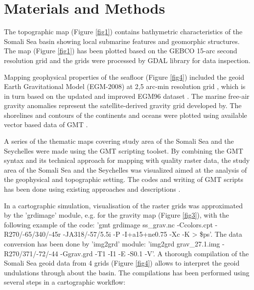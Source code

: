 \documentclass[]{interact}
\begin{document}
\section{Materials and Methods}\label{labelforsection}

The topographic map (Figure \ref{fig1}) contains bathymetric characteristics of the Somali Sea basin showing local submarine features and geomorphic structures. The map (Figure \ref{fig1}) has been plotted based on the GEBCO 15-arc second resolution grid \cite{GEBCO} and the grids were processed by GDAL library \cite{GDAL} for data inspection. 

Mapping geophysical properties of the seafloor (Figure \ref{fig4}) included the geoid Earth Gravitational Model (EGM-2008) at 2,5 arc-min resolution grid \cite{Pavlisetal2012}, which is in turn based on the updated and improved EGM96 dataset \cite{Lemoineetal1998}. The marine free-air gravity anomalies represent the satellite-derived gravity grid developed by\cite{Sandwelletal2014}. The shorelines and contours of the continents and oceans were plotted using available vector based data of GMT \cite{WesselSmith1996}. 

A series of the thematic maps covering study area of the Somali Sea and the Seychelles were made using the GMT scripting toolset. By combining the GMT syntax and its technical approach for mapping with quality raster data, the study area of the Somali Sea and the Seychelles was visualized aimed at the analysis of the geophysical and topographic setting. The codes and writing of GMT scripts has been done using existing approaches and descriptions \cite{Lemenkova202104,Lemenkova2020a,Lemenkova202127}.

In a cartographic simulation, visualisation of the raster grids was approximated by the 'grdimage' module, e.g. for the gravity map (Figure \ref{fig3}), with the following example of the code: 'gmt grdimage ss\_grav.nc -Ccolors.cpt -R270/-65/340/-45r -JA318/-57/5.5i -P -I+a15+ne0.75 -Xc -K > \$ps'. The data conversion has been done by 'img2grd' module: 'img2grd grav\_27.1.img -R270/371/-72/-44 -Ggrav.grd -T1 -I1 -E -S0.1 -V'.
A thorough compilation of the Somali Sea geoid data from 4 grids (Figure \ref{fig4}) allows to interpret the geoid undulations through about the basin. The compilations has been performed using several steps in a cartographic workflow: 
\end{document}
